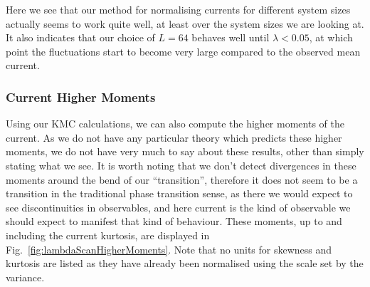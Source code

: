 Here we see that our method for normalising currents for different system sizes actually seems
to work quite well, at least over the system sizes we are looking at. It also indicates that our choice of
$L=64$ behaves well until $\lambda < 0.05$, at which point the fluctuations start to become very large 
compared to the observed mean current.

\subsubsection{Current Higher Moments}
Using our KMC calculations, we can also compute the higher moments of the current. As we do not have any 
particular theory which predicts these higher moments, we do not have very much to say about these
results, other than simply stating what we see. It is worth noting that we don't detect divergences
in these moments around the bend of our ``transition'', therefore it does not seem to be a transition
in the traditional phase transition sense, as there we would expect to see discontinuities in observables,
and here current is the kind of observable we should expect to manifest that kind of behaviour.
These moments, up to and including the current kurtosis, are displayed in 
Fig.~\ref{fig:lambdaScanHigherMoments}. Note that no units for skewness and kurtosis are listed
as they have already been normalised using the scale set by the variance.
